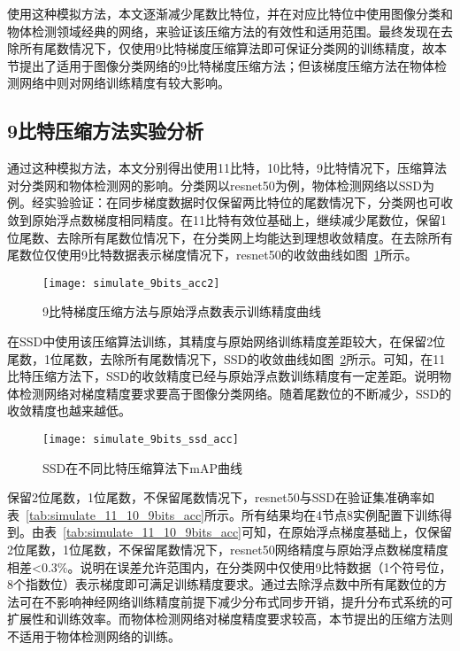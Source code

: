 使用这种模拟方法，本文逐渐减少尾数比特位，并在对应比特位中使用图像分类和物体检测领域经典的网络，来验证该压缩方法的有效性和适用范围。最终发现在去除所有尾数情况下，仅使用9比特梯度压缩算法即可保证分类网的训练精度，故本节提出了适用于图像分类网络的9比特梯度压缩方法；但该梯度压缩方法在物体检测网络中则对网络训练精度有较大影响。

\subsection{9比特压缩方法实验分析}
通过这种模拟方法，本文分别得出使用11比特，10比特，9比特情况下，压缩算法对分类网和物体检测网的影响。分类网以resnet50为例，物体检测网络以SSD为例。经实验验证：在同步梯度数据时仅保留两比特位的尾数情况下，分类网也可收敛到原始浮点数梯度相同精度。在11比特有效位基础上，继续减少尾数位，保留1位尾数、去除所有尾数位情况下，在分类网上均能达到理想收敛精度。在去除所有尾数位仅使用9比特数据表示梯度情况下，resnet50的收敛曲线如图~\ref{fig:simulate_9bits_acc}所示。

\begin{figure}[htp]
\centering
\texttt{[image: simulate\_9bits\_acc2]}
\caption{9比特梯度压缩方法与原始浮点数表示训练精度曲线}
\label{fig:simulate_9bits_acc}
\end{figure}

在SSD中使用该压缩算法训练，其精度与原始网络训练精度差距较大，在保留2位尾数，1位尾数，去除所有尾数情况下，SSD的收敛曲线如图~\ref{fig:simulate_9bits_ssd_acc}所示。可知，在11比特压缩方法下，SSD的收敛精度已经与原始浮点数训练精度有一定差距。说明物体检测网络对梯度精度要求要高于图像分类网络。随着尾数位的不断减少，SSD的收敛精度也越来越低。
\begin{figure}[htp]
\centering
\texttt{[image: simulate\_9bits\_ssd\_acc]}
\caption{SSD在不同比特压缩算法下mAP曲线}
\label{fig:simulate_9bits_ssd_acc}
\end{figure}

保留2位尾数，1位尾数，不保留尾数情况下，resnet50与SSD在验证集准确率如表~\ref{tab:simulate_11_10_9bits_acc}所示。所有结果均在4节点8实例配置下训练得到。由表~\ref{tab:simulate_11_10_9bits_acc}可知，在原始浮点梯度基础上，仅保留2位尾数，1位尾数，不保留尾数情况下，resnet50网络精度与原始浮点数梯度精度相差<0.3\%。说明在误差允许范围内，在分类网中仅使用9比特数据（1个符号位，8个指数位）表示梯度即可满足训练精度要求。通过去除浮点数中所有尾数位的方法可在不影响神经网络训练精度前提下减少分布式同步开销，提升分布式系统的可扩展性和训练效率。而物体检测网络对梯度精度要求较高，本节提出的压缩方法则不适用于物体检测网络的训练。

